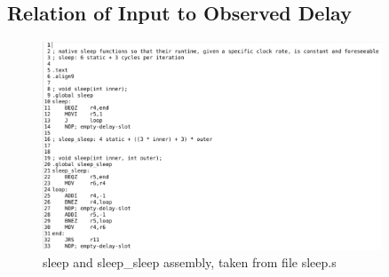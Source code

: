		\subsection{Relation of Input to Observed Delay} %
		\label{sub:relation_of_input_to_observed_delay}
			\begin{figure}[!htb]
				\centering
					\includegraphics[width=0.9\textwidth]{images/sleep_asm.jpg}
				\caption{sleep and sleep\_sleep assembly, taken from file sleep.s}
				\label{fig:sleep_asm}
			\end{figure}

